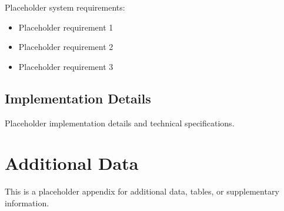 Placeholder system requirements:

\begin{itemize}
\item Placeholder requirement 1
\item Placeholder requirement 2
\item Placeholder requirement 3
\end{itemize}

\subsection{Implementation Details}\label{app:implementation-details}

Placeholder implementation details and technical specifications.

\section{Additional Data}\label{app:additional-data}

This is a placeholder appendix for additional data, tables, or supplementary information.



